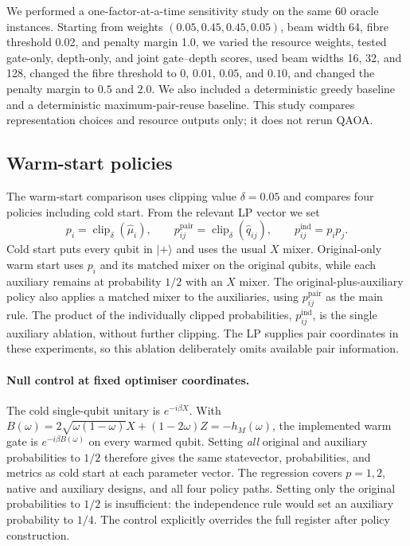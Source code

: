\documentclass[a4paper,onecolumn,11pt,unpublished]{quantumarticle}
\theoremstyle{remark}
\begin{document}
We performed a one-factor-at-a-time sensitivity study on the same 60 oracle
instances.  Starting from weights $(0.05,0.45,0.45,0.05)$, beam width 64,
fibre threshold 0.02, and penalty margin 1.0, we varied the resource weights,
tested gate-only, depth-only, and joint gate--depth scores, used beam widths
16, 32, and 128, changed the fibre threshold to $0$, $0.01$, $0.05$, and
$0.10$, and changed the penalty margin to $0.5$ and $2.0$.  We also included
a deterministic greedy baseline and a deterministic maximum-pair-reuse
baseline.  This study compares representation choices and resource outputs
only; it does not rerun QAOA.


\subsection{Warm-start policies}
\label{app:experimental-warm}

The warm-start comparison uses clipping value $\delta=0.05$ and compares four policies including cold start. From the relevant LP vector we set
\begin{equation}
  p_i=\operatorname{clip}_\delta(\widehat\mu_i),
  \qquad
  p_{ij}^{\mathrm{pair}}
  =\operatorname{clip}_\delta(\widehat q_{ij}),
  \qquad
  p_{ij}^{\mathrm{ind}}=p_i p_j.
  \label{eq:experimental-warm-probabilities}
\end{equation}
Cold start puts every qubit in $|+\rangle$ and uses the usual $X$ mixer.
Original-only warm start uses $p_i$ and its matched mixer on the original
qubits, while each auxiliary remains at probability $1/2$ with an $X$ mixer.
The original-plus-auxiliary policy also applies a matched mixer to the
auxiliaries, using $p_{ij}^{\mathrm{pair}}$ as the main rule.  The product of
the individually clipped probabilities, $p_{ij}^{\mathrm{ind}}$, is the single
auxiliary ablation, without further clipping. The LP supplies pair coordinates
in these experiments, so this ablation deliberately omits available pair
information.

\paragraph{Null control at fixed optimiser coordinates.}
The cold single-qubit unitary is $e^{-i\beta X}$. With
$B(\omega)=2\sqrt{\omega(1-\omega)}X+(1-2\omega)Z=-h_M(\omega)$,
the implemented warm gate is $e^{-i\beta B(\omega)}$ on every warmed
qubit. Setting \emph{all} original and auxiliary probabilities to $1/2$
therefore gives the same statevector, probabilities, and metrics as cold
start at each parameter vector. The regression covers $p=1,2$, native and
auxiliary designs, and all four policy paths. Setting only the original
probabilities to $1/2$ is insufficient: the independence rule would set an
auxiliary probability to $1/4$. The control explicitly overrides the full
register after policy construction.
\end{document}
